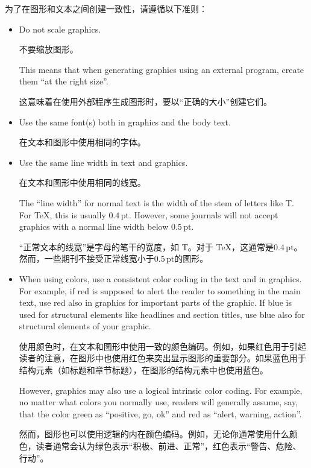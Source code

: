 为了在图形和文本之间创建一致性，请遵循以下准则：
%
\begin{itemize}
    \item Do not scale graphics.

    不要缩放图形。



        This means that when generating graphics using an external program,
        create them ``at the right size''.

        这意味着在使用外部程序生成图形时，要以“正确的大小”创建它们。

    \item Use the same font(s) both in graphics and the body text.

    在文本和图形中使用相同的字体。


    \item Use the same line width in text and graphics.

    在文本和图形中使用相同的线宽。


        The ``line width'' for normal text is the width of the stem of letters
        like T{}. For \TeX, this is usually $0.4\,\mathrm{pt}$. However, some
        journals will not accept graphics with a normal line width below
        $0.5\,\mathrm{pt}$.

        “正常文本的线宽”是字母的笔干的宽度，如 T{}。对于 \TeX，这通常是$0.4\,\mathrm{pt}$。然而，一些期刊不接受正常线宽小于$0.5\,\mathrm{pt}$的图形。

    \item When using colors, use a consistent color coding in the text and in
        graphics. For example, if red is supposed to alert the reader to
        something in the main text, use red also in graphics for important
        parts of the graphic. If blue is used for structural elements like
        headlines and section titles, use blue also for structural elements
        of your graphic.

        使用颜色时，在文本和图形中使用一致的颜色编码。例如，如果红色用于引起读者的注意，在图形中也使用红色来突出显示图形的重要部分。如果蓝色用于结构元素（如标题和章节标题），在图形的结构元素中也使用蓝色。


        However, graphics may also use a logical intrinsic color
        coding. For example, no matter what colors you normally use, readers
        will generally assume, say, that the color green as ``positive, go,
        ok'' and red as ``alert, warning, action''.

        然而，图形也可以使用逻辑的内在颜色编码。例如，无论你通常使用什么颜色，读者通常会认为绿色表示“积极、前进、正常”，红色表示“警告、危险、行动”。

\end{itemize}

